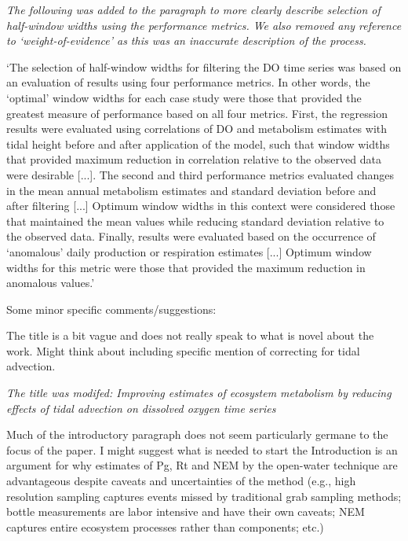 \documentclass[letterpaper,12pt]{article}\usepackage[]{graphicx}\usepackage[]{color}
\begin{document}
{\it The following was added to the paragraph to more clearly describe selection of half-window widths using the performance metrics.  We also removed any reference to `weight-of-evidence' as this was an inaccurate description of the process.

`The selection of half-window widths for filtering the DO time series was based on an evaluation of results using four performance metrics.  In other words, the `optimal' window widths for each case study were those that provided the greatest measure of performance based on all four metrics.  First, the regression results were evaluated using correlations of DO and metabolism estimates with tidal height before and after application of the model, such that window widths that provided maximum reduction in correlation relative to the observed data were desirable [...]. The second and third performance metrics evaluated changes in the mean annual metabolism estimates and standard deviation before and after filtering [...] Optimum window widths in this context were considered those that maintained the mean values while reducing standard deviation relative to the observed data. Finally, results were evaluated based on the occurrence of `anomalous' daily production or respiration estimates [...] Optimum window widths for this metric were those that provided the maximum reduction in anomalous values.'
}

Some minor specific comments/suggestions:

The title is a bit vague and does not really speak to what is novel about the work. Might think about including specific mention of correcting for tidal advection.

{\it The title was modifed: Improving estimates of ecosystem metabolism by reducing effects of tidal advection on dissolved oxygen time series}

Much of the introductory paragraph does not seem particularly germane to the focus of the paper. I might suggest what is needed to start the Introduction is an argument for why estimates of Pg, Rt and NEM by the open-water technique are advantageous despite caveats and uncertainties of the method (e.g., high resolution sampling captures events missed by traditional grab sampling methods; bottle measurements are labor intensive and have their own caveats; NEM captures entire ecosystem processes rather than components; etc.)
\end{document}
